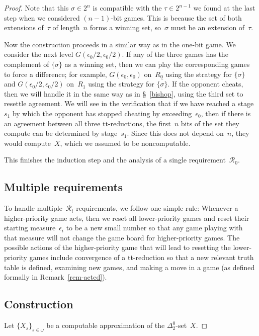 \documentclass{LMCS}
\newcommand{\0}{\mathbf{0}}
\newcommand{\<}{\langle}
\renewcommand{\>}{\rangle}
\begin{document}
\begin{proof}
Note that this $\sigma\in 2^n$ is compatible with the $\tau\in 2^{n-1}$ we
found at the last step when we considered $(n-1)$-bit games.  This is because
the set of both extensions of~$\tau$ of length~$n$ forms a winning set,
so~$\sigma$ must be an extension of~$\tau$.


Now the construction proceeds in a similar way as in the one-bit game. We
consider the next level $G(\epsilon_0/2,\epsilon_0/2)$. If any of the three
games has the complement of $\{\sigma\}$ as a winning set, then we can play
the corresponding games to force a difference; for example,
$G(\epsilon_0,\epsilon_0)$ on~$R_0$ using the strategy for $\{\sigma\}$ and
$G(\epsilon_0/2,\epsilon_0/2)$ on~$R_1$ using the strategy for
$\overline{\{\sigma\}}$. If the opponent cheats, then we will handle it in
the same way as in \S~\ref{bishop}, using the third set to resettle
agreement. We will see in the verification that if we have reached a
stage~$s_1$ by which the opponent has stopped cheating by
exceeding~$\epsilon_0$, then if there is an agreement between all three
tt-reductions, the first~$n$ bits of the set they compute can be determined
by stage~$s_1$. Since this does not depend on~$n$, they would compute~$X$,
which we assumed to be noncomputable.

This finishes the induction step and the analysis of a single
requirement~$\mathcal{R}_0$.

\subsection{Multiple requirements}

To handle multiple~$\mathcal{R}_i$-requirements, we follow one simple rule:
Whenever a higher-priority game acts, then we reset all lower-priority games
and reset their starting measure~$\epsilon_i$ to be a new small number so
that any game playing with that measure will not change the game board for
higher-priority games.  The possible actions of the higher-priority game that
will lead to resetting the lower-priority games include convergence of a
tt-reduction so that a new relevant truth table is defined,
examining new games, and making a move in a game (as defined formally in
Remark~\ref{rem-acted}).

\subsection{Construction}\label{const}
Let $\{X_s\}_{s\in \omega}$ be a computable approximation of the
$\Delta^0_2$-set~$X$.


\end{proof}
\end{document}
